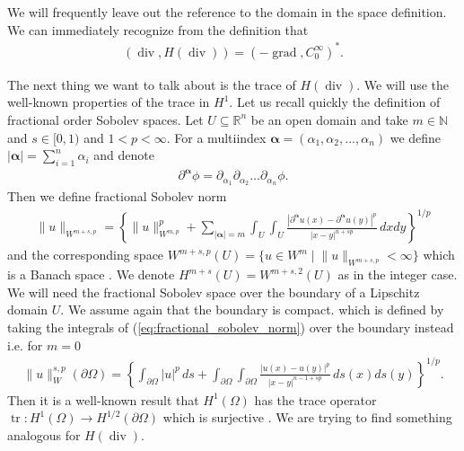 \documentclass[12pt,a4paper]{article}
\numberwithin{equation}{subsection}
\numberwithin{lemma}{subsection}
\theoremstyle{definition}
\DeclareMathOperator{\diver}{div}
\DeclareMathOperator{\grad}{grad}
\DeclareMathOperator{\tr}{tr}
\newcommand{\naturalnum}{\mathbb{N}}
\newcommand{\real}{\mathbb{R}}
\begin{document}
We will frequently leave out the reference to the domain in the space definition.
We can immediately recognize from the definition that 
\begin{align}
    (\diver, H(\diver)) = (-\grad, C_0^\infty)^*. \label{eq:adjoint_grad_c0inf}
\end{align}

The next thing we want to talk about is the trace of $H(\diver)$. 
We will use the well-known properties of the trace in $H^1$. 
Let us recall 
quickly the definition of fractional order Sobolev spaces. Let 
$U \subseteq \real^n$ be an open domain and take $m \in \naturalnum$ and 
$s \in [0, 1)$ and $1 < p < \infty$. For a multiindex $\boldsymbol{\alpha} = 
(\alpha_1, \alpha_2, ..., \alpha_n)$ we define $|\boldsymbol{\alpha}| = \sum_{i=1}^n \alpha_i$ 
and denote 
\begin{align}
    \partial^{\bm{\alpha}} \phi = 
    \partial_{\alpha_1} \partial_{\alpha_2} \dots \partial_{\alpha_n} \phi.
\end{align}
Then we define fractional Sobolev norm
\begin{align}
    \lVert u \rVert _ {W^{m+s, p}} = \left\{ \lVert u \rVert ^p_{W^{m, p}} + 
        \sum_{|\bm{\alpha}|=m} \int_U \int_U 
        \frac{|\partial^{\bm{\alpha}} u(x) - \partial^{\bm{\alpha}} u(y)|^p}
        {|x - y|^{n+sp}} \, dx dy\right\}^{1/p}\label{eq:fractional_sobolev_norm}
\end{align}
and the corresponding space $W^{m+s, p}(U) = \{ u \in W^m \mid \lVert u \rVert _{W^{m+s, p}} < \infty \}$ 
which is a Banach space \cite[p.42]{monk}. We denote 
$H^{m+s}(U) = W^{m+s, 2}(U)$ as in the integer case. We will need the 
fractional Sobolev space over the boundary of a Lipschitz domain $U$. We assume 
again that the boundary is compact.
which is defined by taking the integrals of (\ref{eq:fractional_sobolev_norm}) 
over the boundary instead i.e. for $m = 0$
\begin{align*}
    \lVert u \rVert _W^{s, p}(\partial \Omega) = \left\{ \int_{\partial\Omega} |u|^p \, ds + 
        \int_{\partial\Omega} \int_{\partial\Omega}
        \frac{|u(x) - u(y)|^p}
        {|x - y|^{n-1+sp}} \, ds(x) ds(y)\right\}^{1/p}.
\end{align*}
Then it 
is a well-known result that $H^1(\Omega)$ has the trace operator 
$\tr: H^1(\Omega) \rightarrow H^{1/2}(\partial \Omega)$ which is surjective \cite[p.28]{arnold}.
We are trying to find something analogous for $H(\diver)$.
\end{document}
